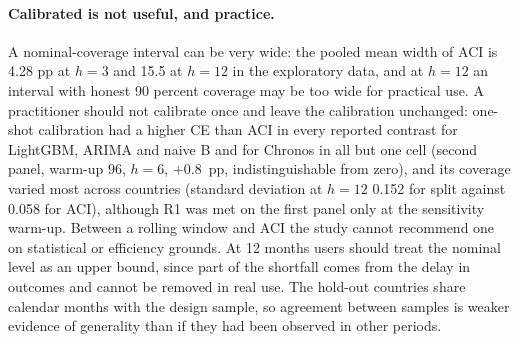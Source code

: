 \paragraph{Calibrated is not useful, and practice.} A nominal-coverage interval can be very wide: the pooled mean width of ACI is 4.28 pp at $h=3$ and 15.5 at $h=12$ in the exploratory data, and at $h=12$ an interval with honest 90 percent coverage may be too wide for practical use. A practitioner should not calibrate once and leave the calibration unchanged: one-shot calibration had a higher CE than ACI in every reported contrast for LightGBM, ARIMA and naive B and for Chronos in all but one cell (second panel, warm-up 96, $h=6$, $+0.8$~pp, indistinguishable from zero), and its coverage varied most across countries (standard deviation at $h=12$ 0.152 for split against 0.058 for ACI), although R1 was met on the first panel only at the sensitivity warm-up. Between a rolling window and ACI the study cannot recommend one on statistical or efficiency grounds. At 12 months users should treat the nominal level as an upper bound, since part of the shortfall comes from the delay in outcomes and cannot be removed in real use. The hold-out countries share calendar months with the design sample, so agreement between samples is weaker evidence of generality than if they had been observed in other periods.
